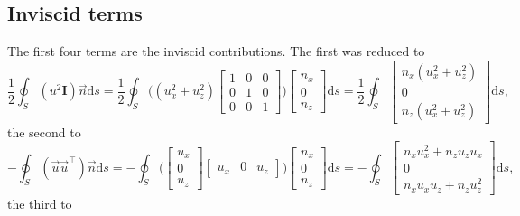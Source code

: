 \documentclass[wes, manuscript]{copernicus}
\begin{document}
\subsection{Inviscid terms}
The first four terms are the inviscid contributions. The first was reduced to
%
\begin{equation}
\frac{1}{2} \oint_{S} (u^{2}\mathbf{I}) \vec{n}  \textrm{d}s
= \frac{1}{2} \oint_{S} 
\Bigg(
(u_{{x}}^{2} + u_{{z}}^{2})
\begin{bmatrix} 1 & 0 & 0 \\ 0 & 1 & 0 \\ 0 & 0 & 1 \end{bmatrix}
\Bigg)
\begin{bmatrix} n_{{x}} \\ 0 \\ n_{{z}} \end{bmatrix} \textrm{d}s
= \frac{1}{2} \oint_{S}
\begin{bmatrix} n_{{x}}(u_{{x}}^{2}+u_{{z}}^{2}) \\ 0 \\ n_{{z}}(u_{{x}}^{2}+u_{{z}}^{2}) \end{bmatrix} \textrm{d}s ,
\end{equation}
%
the second to
%
\begin{equation}
-\!\oint_{S} (\vec{u}\vec{u}^{\top}) \vec{n}  \textrm{d}s
= -\!\oint_{S}
\Bigg(
\begin{bmatrix} u_{{x}} \\ 0 \\ u_{{z}} \end{bmatrix}
\begin{bmatrix} u_{{x}} & 0 & u_{{z}} \end{bmatrix}
\Bigg)
\begin{bmatrix} n_{{x}} \\ 0 \\ n_{{z}} \end{bmatrix} \textrm{d}s
= -\!\oint_{S}
\begin{bmatrix} n_{{x}}u_{{x}}^{2} + n_{{z}}u_{{z}}u_{{x}} \\ 0 \\ n_{{x}}u_{{x}}u_{{z}} + n_{{z}}u_{{z}}^{2} \end{bmatrix} \textrm{d}s ,
\end{equation}
%
the third to
%
\end{document}
